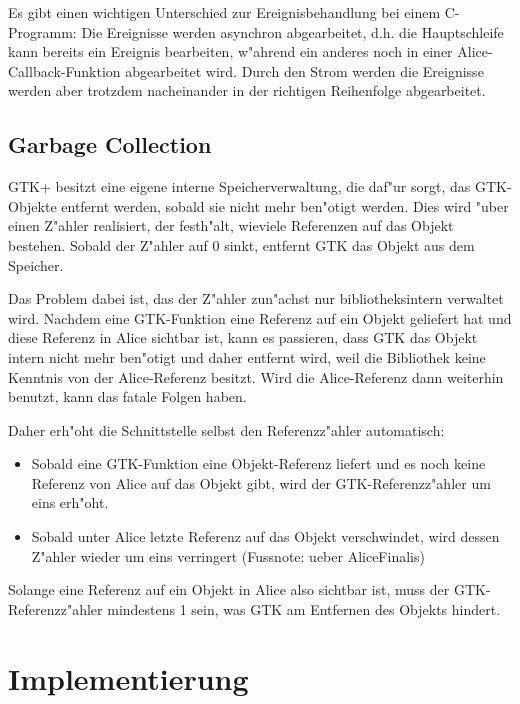 \documentclass[a4paper,titlepage]{article}
\begin{document}
Es gibt einen wichtigen Unterschied
zur Ereignisbehandlung bei einem C-Programm: Die Ereignisse werden asynchron
abgearbeitet, d.h. die Hauptschleife kann bereits ein Ereignis bearbeiten,
w"ahrend ein anderes noch in einer Alice-Callback-Funktion abgearbeitet wird.
Durch den Strom werden die Ereignisse werden aber trotzdem nacheinander
in der richtigen Reihenfolge abgearbeitet.

\subsection{Garbage Collection}

GTK+ besitzt eine eigene interne Speicherverwaltung, die daf"ur sorgt,
das GTK-Objekte entfernt werden, sobald sie nicht mehr ben"otigt werden.
Dies wird "uber einen Z"ahler realisiert, der festh"alt, wieviele
Referenzen auf das Objekt bestehen. Sobald der Z"ahler auf 0 sinkt,
entfernt GTK das Objekt aus dem Speicher.

Das Problem dabei ist, das der Z"ahler zun"achst nur bibliotheksintern
verwaltet wird. Nachdem eine GTK-Funktion eine Referenz
auf ein Objekt geliefert hat und diese Referenz in Alice sichtbar ist,
kann es passieren, dass GTK das Objekt intern nicht mehr ben"otigt und
daher entfernt wird, weil die Bibliothek keine Kenntnis von der Alice-Referenz
besitzt. Wird die Alice-Referenz dann weiterhin benutzt, kann das fatale
Folgen haben.

Daher erh"oht die Schnittstelle selbst den Referenzz"ahler automatisch:

\begin{itemize}
\item Sobald eine GTK-Funktion eine Objekt-Referenz liefert und es noch keine
      Referenz von Alice auf das Objekt gibt, wird der GTK-Referenzz"ahler
      um eins erh"oht.
\item Sobald unter Alice letzte Referenz auf das Objekt verschwindet, wird
      dessen Z"ahler wieder um eins verringert (Fussnote: ueber AliceFinalis)
\end{itemize}

Solange eine Referenz auf ein Objekt in Alice also sichtbar ist, muss der
GTK-Referenz\-z"ahler mindestens 1 sein, was GTK am Entfernen des Objekts
hindert.


\section{Implementierung}
\label{Implementierung}
\end{document}
